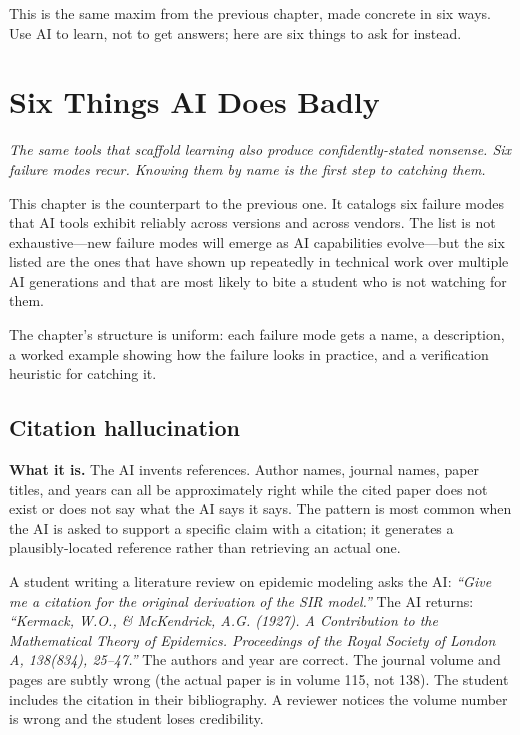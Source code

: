\documentclass[11pt]{book}
\begin{document}
This is the same maxim from the previous chapter, made concrete in six ways. Use AI to learn, not to get answers; here are six things to ask for instead.

\chapter{Six Things AI Does Badly}
\label{ch:six-badly}

\noindent \emph{The same tools that scaffold learning also produce confidently-stated nonsense. Six failure modes recur. Knowing them by name is the first step to catching them.}

\medskip

This chapter is the counterpart to the previous one. It catalogs six failure modes that AI tools exhibit reliably across versions and across vendors. The list is not exhaustive---new failure modes will emerge as AI capabilities evolve---but the six listed are the ones that have shown up repeatedly in technical work over multiple AI generations and that are most likely to bite a student who is not watching for them.

The chapter's structure is uniform: each failure mode gets a name, a description, a worked example showing how the failure looks in practice, and a verification heuristic for catching it.

\section{Citation hallucination}
\label{sec:citation-hallucination}

\textbf{What it is.} The AI invents references. Author names, journal names, paper titles, and years can all be approximately right while the cited paper does not exist or does not say what the AI says it says. The pattern is most common when the AI is asked to support a specific claim with a citation; it generates a plausibly-located reference rather than retrieving an actual one.

\begin{example}
A student writing a literature review on epidemic modeling asks the AI: \emph{``Give me a citation for the original derivation of the SIR model.''} The AI returns: \emph{``Kermack, W.O., \& McKendrick, A.G. (1927). A Contribution to the Mathematical Theory of Epidemics. Proceedings of the Royal Society of London A, 138(834), 25--47.''} The authors and year are correct. The journal volume and pages are subtly wrong (the actual paper is in volume 115, not 138). The student includes the citation in their bibliography. A reviewer notices the volume number is wrong and the student loses credibility.
\end{example}
\end{document}
